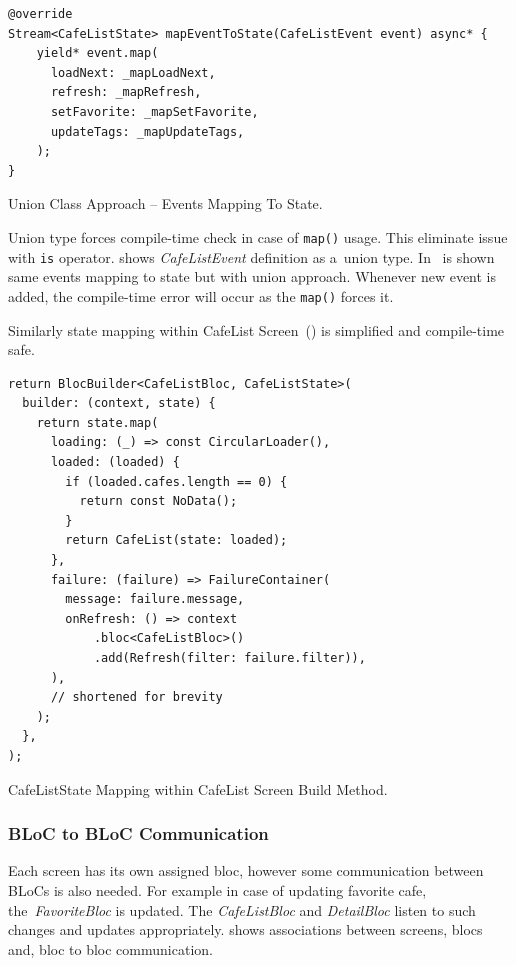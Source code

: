 \begin{listing}[ht]
\begin{verbatim}
@override
Stream<CafeListState> mapEventToState(CafeListEvent event) async* {
    yield* event.map(
      loadNext: _mapLoadNext,
      refresh: _mapRefresh,
      setFavorite: _mapSetFavorite,
      updateTags: _mapUpdateTags,
    );
}
\end{verbatim}
\caption{Union Class Approach -- Events Mapping To State.}
\label{listing:ct-event-union-usage}
\end{listing}

Union type forces compile-time check in case of \verb|map()| usage. This eliminate issue with \verb|is| operator.  shows \textit{CafeListEvent} definition as a~union type. In~ is shown same events mapping to state but with union approach. Whenever new event is added, the compile-time error will occur as the \verb|map()| forces it.

Similarly state mapping within CafeList Screen~() is simplified and compile-time safe. 

\begin{listing}[ht!]
\begin{verbatim}
return BlocBuilder<CafeListBloc, CafeListState>(
  builder: (context, state) {
    return state.map(
      loading: (_) => const CircularLoader(),
      loaded: (loaded) {
        if (loaded.cafes.length == 0) {
          return const NoData();
        }
        return CafeList(state: loaded);
      },
      failure: (failure) => FailureContainer(
        message: failure.message,
        onRefresh: () => context
            .bloc<CafeListBloc>()
            .add(Refresh(filter: failure.filter)),
      ),
      // shortened for brevity
    );
  },
);
\end{verbatim}
\caption{CafeListState Mapping within CafeList Screen Build Method.}
\label{listing:ct-state-cafe-list-union-usage}
\end{listing}

\subsubsection{BLoC to BLoC Communication}
Each screen has its own assigned \gls{bloc}, however some communication between BLoCs is also needed. For example in case of updating favorite cafe, the~\textit{FavoriteBloc} is updated. The\textit{ CafeListBloc} and \textit{DetailBloc} listen to such changes and updates appropriately.  shows associations between screens, blocs and, bloc to bloc communication.

